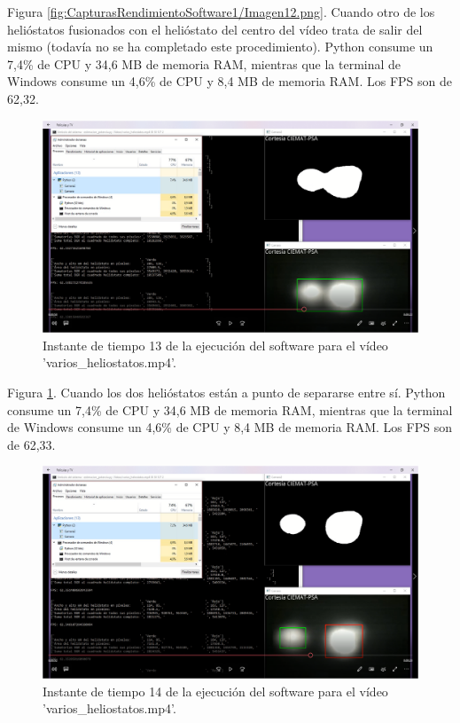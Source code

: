 Figura \ref{fig:CapturasRendimientoSoftware1/Imagen12.png}. Cuando otro de los helióstatos fusionados con el helióstato del centro del vídeo trata de salir del mismo (todavía no se ha completado este procedimiento). Python consume un 7,4\% de CPU y 34,6 MB de memoria RAM, mientras que la terminal de Windows consume un 4,6\% de CPU y 8,4 MB de memoria RAM. Los FPS son de 62,32.

\begin{figure}[h!]
  	\centering
	\includegraphics[width=\textwidth]{CapturasRendimientoSoftware1/Imagen13.png}
	\caption{Instante de tiempo 13 de la ejecución del software para el vídeo 'varios\_heliostatos.mp4'.
	\label{fig:CapturasRendimientoSoftware1/Imagen13.png}}
\end{figure}

Figura \ref{fig:CapturasRendimientoSoftware1/Imagen13.png}. Cuando los dos helióstatos están a punto de separarse entre sí. Python consume un 7,4\% de CPU y 34,6 MB de memoria RAM, mientras que la terminal de Windows consume un 4,6\% de CPU y 8,4 MB de memoria RAM. Los FPS son de 62,33.

\begin{figure}[h!]
  	\centering
	\includegraphics[width=\textwidth]{CapturasRendimientoSoftware1/Imagen14.png}
	\caption{Instante de tiempo 14 de la ejecución del software para el vídeo 'varios\_heliostatos.mp4'.
	\label{fig:CapturasRendimientoSoftware1/Imagen14.png}}
\end{figure}

